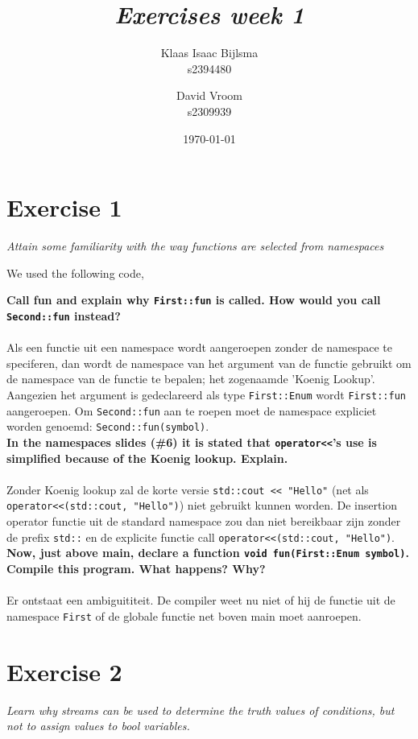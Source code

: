 \documentclass[12pt]{article}
\title{\itshape Exercises week 1}
\author{
	Klaas Isaac Bijlsma \\ s2394480
	\and
	David Vroom \\ s2309939
}
\date{\today}
\newcommand{\desc}[1]{\textit{#1} \vspace{1em}}
\begin{document}
\maketitle

\section*{Exercise 1}
\desc{Attain some familiarity with the way functions are selected from namespaces}

We used the following code,


\textbf{Call fun and explain why \texttt{First::fun} is called. How would you call \texttt{Second::fun} instead?}\\
\\
Als een functie uit een namespace wordt aangeroepen zonder de namespace te speciferen, dan wordt de namespace van het argument van de functie gebruikt om de namespace van de functie te bepalen; het zogenaamde 'Koenig Lookup'. Aangezien het argument is gedeclareerd als type \texttt{First::Enum} wordt \texttt{First::fun} aangeroepen. Om \texttt{Second::fun} aan te roepen moet de namespace expliciet worden genoemd: \texttt{Second::fun(symbol)}.\\

\textbf{In the namespaces slides (\#6) it is stated that \texttt{operator<<}'s use is simplified because of the Koenig lookup. Explain.}\\
\\
Zonder Koenig lookup zal de korte versie \texttt{std::cout << "Hello"} (net als\\ \texttt{operator<<(std::cout, "Hello")}) niet gebruikt kunnen worden. De insertion operator functie uit de standard namespace zou dan niet bereikbaar zijn zonder de prefix \texttt{std::} en de explicite functie call \texttt{operator<<(std::cout, "Hello")}. \\

\textbf{Now, just above main, declare a function \texttt{void fun(First::Enum symbol)}. Compile this program. What happens? Why?}\\
\\
Er ontstaat een ambiguititeit. De compiler weet nu niet of hij de functie uit de namespace \texttt{First} of de globale functie net boven main moet aanroepen.


\clearpage
\section*{Exercise 2}
\desc{Learn why streams can be used to determine the truth values of conditions, but not to assign values to bool variables.}
\end{document}
